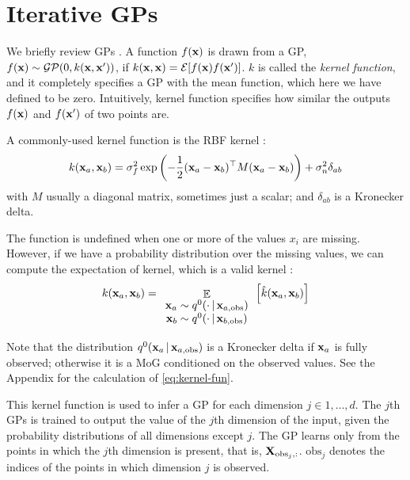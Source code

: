 \documentclass[letterpaper]{article}
\newcommand{\vbar}{\,|\,}
\DeclareMathOperator*{\E}{\Ex}
\newcommand{\Ex}{\mathbb{E}}
\newcommand{\tp}{\top}
\newcommand{\vx}{{\bf x}}
\begin{document}
\section{Iterative \aclp{GP}}

We briefly review \acp{GP} \citep{rasmussen2006gaussian}. A function $f(\vx)$ is
drawn from a \acl{GP}, $f(\vx) \sim \mathcal{GP}(0, k(\vx, \vx'))$, if $k(\vx,
\vx) = \mathcal{E}[f(\vx)f(\vx')]$. $k$ is called the \emph{kernel function},
and it completely specifies a \ac{GP} with the mean function, which here we have
defined to be zero. Intuitively, kernel function specifies how similar the
outputs $f(\vx)$ and $f(\vx')$ of two points are.

A commonly-used kernel function is the \ac{RBF} kernel
\citep[Equation~5.1]{rasmussen2006gaussian}:
\begin{equation}
k(\vx_a, \vx_b) =  \sigma_f^2 \exp\left( -\frac{1}{2}(\vx_a - \vx_b)^\tp M
    (\vx_a - \vx_b) \right) + \sigma_n^2 \delta_{ab}
\label{eq:rbf-definition}
\end{equation}
with $M$ usually a diagonal matrix, sometimes just a scalar; and $\delta_{ab}$
is a Kronecker delta.

The function is undefined when one or more of the values $x_i$ are missing.
However, if we have a probability distribution over the missing values, we can
compute the expectation of kernel, which is a valid kernel
\citep{nebot2010kernel}:
\begin{equation}
k(\vx_a, \vx_b) =
\E_{\begin{array}{c}
  \vx_a \sim q^0(\cdot \vbar \vx_{a,\text{obs}}) \\
  \vx_b \sim q^0(\cdot \vbar \vx_{b,\text{obs}}) \end{array}} \left[
\hat{k}(\vx_a, \vx_b) \right]
\label{eq:kernel-fun}
\end{equation}

Note that the distribution $q^0(\vx_a \vbar \vx_{a,\text{obs}})$ is a Kronecker
delta if $\vx_a$ is fully observed; otherwise it is a \ac{MoG} conditioned on
the observed values. See the Appendix for the calculation of \ref{eq:kernel-fun}.

This kernel function is used to infer a \ac{GP} for each dimension $j\in
1,\dots,d$. The $j$th \acp{GP} is trained to output the value of the $j$th
dimension of the input, given the probability distributions of all dimensions
except $j$. The \ac{GP} learns only from the points in
which the $j$th dimension is present, that is, ${\bf X}_{\text{obs}_j,:}$.
$\text{obs}_j$ denotes the indices of the points in which dimension $j$ is
observed.
\end{document}

